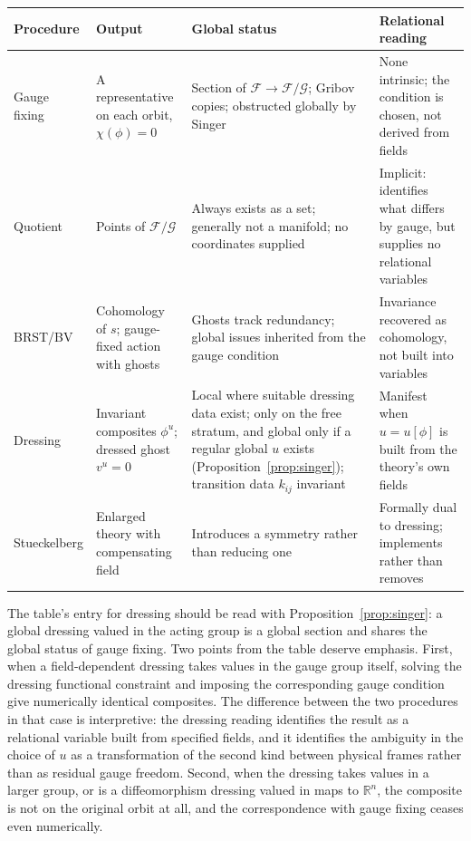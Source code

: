 \documentclass[11pt]{article}
\theoremstyle{plain}
\theoremstyle{definition}
\theoremstyle{remark}
\newcommand{\F}{\mathcal F}
\newcommand{\G}{\mathcal G}
\begin{document}
\begin{center}
\small
\begin{tabular}{@{}>{\raggedright\arraybackslash}p{2.1cm}>{\raggedright\arraybackslash}p{3.0cm}>{\raggedright\arraybackslash}p{3.0cm}>{\raggedright\arraybackslash}p{3.3cm}@{}}
\toprule
Procedure & Output & Global status & Relational reading \\
\midrule
Gauge fixing & A representative on each orbit, $\chi(\phi)=0$ & Section of $\F\to\F/\G$; Gribov copies; obstructed globally by Singer & None intrinsic; the condition is chosen, not derived from fields\\[3pt]
Quotient & Points of $\F/\G$ & Always exists as a set; generally not a manifold; no coordinates supplied & Implicit: identifies what differs by gauge, but supplies no relational variables\\[3pt]
BRST/BV & Cohomology of $s$; gauge-fixed action with ghosts & Ghosts track redundancy; global issues inherited from the gauge condition & Invariance recovered as cohomology, not built into variables\\[3pt]
Dressing & Invariant composites $\phi^u$; dressed ghost $v^u=0$ & Local where suitable dressing data exist; only on the free stratum, and global only if a regular global $u$ exists (Proposition~\ref{prop:singer}); transition data $k_{ij}$ invariant & Manifest when $u=u[\phi]$ is built from the theory's own fields\\[3pt]
Stueckelberg & Enlarged theory with compensating field & Introduces a symmetry rather than reducing one & Formally dual to dressing; implements rather than removes\\
\bottomrule
\end{tabular}
\end{center}

\noindent The table's entry for dressing should be read with Proposition~\ref{prop:singer}: a global dressing valued in the acting group is a global section and shares the global status of gauge fixing. Two points from the table deserve emphasis. First, when a field-dependent dressing takes values in the gauge group itself, solving the dressing functional constraint and imposing the corresponding gauge condition give numerically identical composites. The difference between the two procedures in that case is interpretive: the dressing reading identifies the result as a relational variable built from specified fields, and it identifies the ambiguity in the choice of $u$ as a transformation of the second kind between physical frames rather than as residual gauge freedom. Second, when the dressing takes values in a larger group, or is a diffeomorphism dressing valued in maps to $\mathbb R^n$, the composite is not on the original orbit at all, and the correspondence with gauge fixing ceases even numerically.
\end{document}

